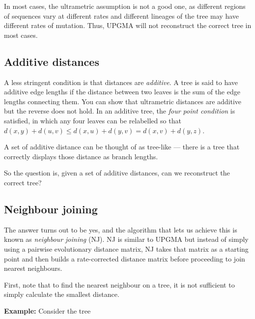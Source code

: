 \documentclass[11pt]{article}
\begin{document}
In most cases, the ultrametric assumption is not a good one, as different regions of sequences vary at different rates and different lineages of the tree may have different rates of mutation.  Thus, UPGMA will not reconstruct the correct tree in most cases.

\subsection{Additive distances}

A less stringent condition is that distances are {\em additive}.  A tree is said to have additive edge lengths if the distance between two leaves is the sum of the edge lengths connecting them.  You can show that ultrametric distances are additive but the reverse does not hold.  In an additive tree, the {\em four point condition} is satisfied, in which any four leaves can be relabelled so that $d(x,y) + d(u,v) \leq d(x,u)+ d(y,v) = d(x,v)+ d(y,z)$.

A set of additive distance can be thought of as tree-like --- there is a tree that correctly displays those distance as branch lengths. 

So the question is, given a set of additive distances, can we reconstruct the correct tree?


\subsection{Neighbour joining}

The answer turns out to be yes, and the algorithm that lets us achieve this is known as {\em neighbour joining} (NJ).  NJ is similar to UPGMA but instead of simply using a pairwise evolutionary distance matrix, NJ takes that matrix as a starting point and then builds a rate-corrected distance matrix before proceeding to join nearest neighbours.

First, note that to find the nearest neighbour on a tree, it is not sufficient to simply calculate the smallest distance.   

{\bf Example:} Consider the tree 
\end{document}
